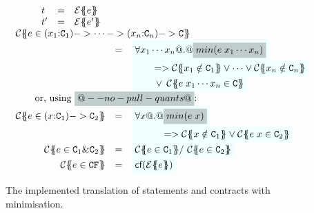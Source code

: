 \begin{figure}
\[\begin{array}{c}
\begin{array}{rcl}
\begin{array}[t]{lcl}
      t  & = & \etrans{\Sigma}{\Gamma}{e} \\
      t' & = & \etrans{\Sigma}{\Gamma}{e'}
    \end{array}
\\
\multicolumn{3}{l}{\trc{e \in (x_1{:}\Ct_1) -> \cdots -> (x_n{:}\Ct_n) -> \Ct}} \\
  & = & \formula{\forall x_1 \cdots x_n @.@ \highlight{min(e\;x_1 \cdots x_n)}} \\
  &   & \formula{\qquad =>       \trc{x_1 \notin \Ct_1} \lor \cdots \lor \trc{x_n \notin \Ct_n}} \\
  &   & \formula{\qquad \,\lor\;\, \trc{e\;x_1 \cdots x_n \in \Ct}}
\\
\multicolumn{3}{l}{\qquad\text{or, using \highlight{@--no-pull-quants@}:}} \\
\trc{e \in (x{:}\Ct_1) -> \Ct_2}
  & = & \formula{\forall x @.@ \highlight{min(e\;x)} } \\
  &   & \formula{\quad\qquad => \trc{x \notin \Ct_1} \lor \trc{e\;x \in \Ct_2}}
\\
\trc{e \in \Ct_1 \& \Ct_2}
   & = & \formula{ \trc{e \in \Ct_1} /\ \trc{e \in \Ct_2}}
\\
\trc{e \in \CF} & = & \formula{\lcf{\etrans{\Sigma}{\Gamma}{e}}} \\
\end{array}
\end{array}\]
\caption{The implemented translation of statements and contracts with minimisation.}\label{fig:min-typing}
\end{figure}
